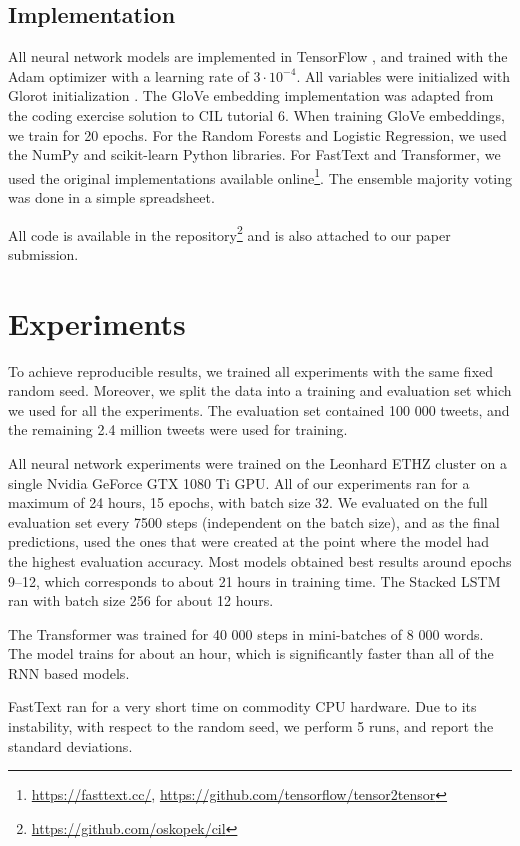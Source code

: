 \documentclass[10pt,conference,compsocconf]{IEEEtran}
\begin{document}
\subsection{Implementation}
All neural network models are implemented in TensorFlow \cite{tensorflow}, and trained with the Adam optimizer \cite{adam} with a learning rate of $3 \cdot 10^{-4}$. All variables were initialized with Glorot initialization \cite{glorot2010understanding}.
The GloVe embedding implementation was adapted from the coding exercise solution to CIL tutorial 6. When training GloVe embeddings, we train for 20 epochs. For the Random Forests and Logistic Regression, we used the NumPy \cite{numpy} and scikit-learn \cite{scikit-learn} Python libraries.
For FastText and Transformer, we used the original implementations available online\footnote{\url{https://fasttext.cc/}, \url{https://github.com/tensorflow/tensor2tensor}}.
The ensemble majority voting was done in a simple spreadsheet.

All code is available in the repository\footnote{\url{https://github.com/oskopek/cil}} and is also attached to our paper submission.


\section{Experiments}
To achieve reproducible results, we trained all experiments with the same fixed random seed. Moreover, we split the data into a training and evaluation set which we used for all the experiments.
The evaluation set contained 100 000 tweets, and the remaining 2.4 million tweets were used for training.

All neural network experiments were trained on the Leonhard ETHZ cluster on a single Nvidia GeForce GTX 1080 Ti GPU.
All of our experiments ran for a maximum of 24 hours, 15 epochs,
with batch size 32.
We evaluated on the full evaluation set every 7500 steps (independent on the batch size), and as the final predictions, used the ones that were created at the point where the model had the highest evaluation accuracy.
Most models obtained best results around epochs 9--12, which corresponds
to about 21 hours in training time.
The Stacked LSTM ran with batch size 256 for about 12 hours.

The Transformer was trained for 40 000 steps in mini-batches of 8 000 words. The model trains for about an hour, which is significantly faster than all of the RNN based models.

FastText ran for a very short time on commodity CPU hardware.
Due to its instability, with respect to the random seed,
we perform 5 runs, and report the standard deviations. 
\end{document}
